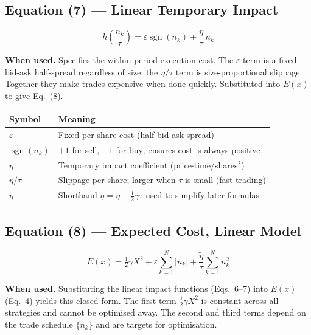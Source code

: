 \documentclass[11pt,a4paper]{article}
\begin{document}
\subsection*{Equation (7) — Linear Temporary Impact}

\begin{equation}
  h\!\left(\frac{n_k}{\tau}\right) = \varepsilon\operatorname{sgn}(n_k) + \frac{\eta}{\tau}\,n_k
\end{equation}

\textbf{When used.} Specifies the within-period execution cost.  The $\varepsilon$ term
is a fixed bid-ask half-spread regardless of size; the $\eta/\tau$ term is
size-proportional slippage.  Together they make trades expensive when done quickly.
Substituted into $E(x)$ to give Eq.~(8).

\begin{center}
\begin{tabular}{@{}L{3.5cm}L{10cm}@{}}
\toprule
\textbf{Symbol} & \textbf{Meaning} \\
\midrule
$\varepsilon$ & Fixed per-share cost (half bid-ask spread) \\
$\operatorname{sgn}(n_k)$ & $+1$ for sell, $-1$ for buy; ensures cost is always positive \\
$\eta$ & Temporary impact coefficient (price$\cdot$time/shares$^2$) \\
$\eta/\tau$ & Slippage per share; larger when $\tau$ is small (fast trading) \\
$\tilde{\eta}$ & Shorthand $\tilde{\eta} = \eta - \tfrac{1}{2}\gamma\tau$ used to simplify later formulas \\
\bottomrule
\end{tabular}
\end{center}

\subsection*{Equation (8) — Expected Cost, Linear Model}

\begin{equation}
  E(x) = \tfrac{1}{2}\gamma X^2
        + \varepsilon \sum_{k=1}^{N} |n_k|
        + \frac{\tilde{\eta}}{\tau} \sum_{k=1}^{N} n_k^2
\end{equation}

\textbf{When used.} Substituting the linear impact functions (Eqs.~6--7) into $E(x)$
(Eq.~4) yields this closed form.  The first term $\tfrac{1}{2}\gamma X^2$ is constant
across all strategies and cannot be optimised away.  The second and third terms depend on
the trade schedule $\{n_k\}$ and are targets for optimisation.
\end{document}
